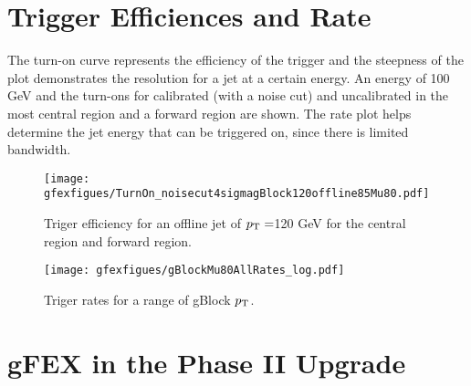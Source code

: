  

\section{Trigger Efficiences and Rate}

The turn-on curve represents the efficiency of the trigger and the steepness of the plot demonstrates the resolution for a jet at a certain energy.  An energy of 100 GeV and the turn-ons for calibrated (with a noise cut) and uncalibrated in the most central region and a forward region are shown.  The rate plot helps determine the jet energy that can be triggered on, since there is limited bandwidth. \\


\begin{figure}[h!]
  \centering
	\texttt{[image: gfexfigues/TurnOn\_noisecut4sigmagBlock120offline85Mu80.pdf]}
\caption{\label{fig:gBlockTurnOn}{Triger efficiency for an offline jet of $p_{\mathrm{T}}=$120 GeV for the central region and forward region.  }} 
\end{figure}

\begin{figure}[h!]
  \centering
	\texttt{[image: gfexfigues/gBlockMu80AllRates\_log.pdf]}
\caption{\label{fig:gBlockRates}{Triger rates for a range of gBlock $p_{\mathrm{T}}$.}} 
\end{figure}


\section{gFEX in the Phase II Upgrade}